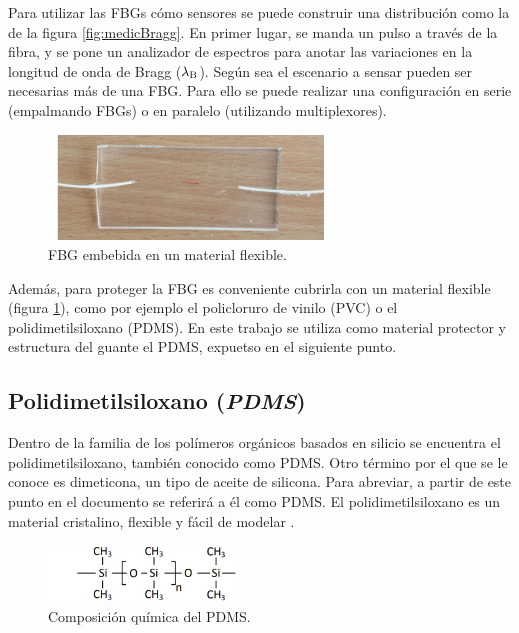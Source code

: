 \begin{itemize}
		Para utilizar las FBGs cómo sensores se puede construir una distribución como la de la figura \ref{fig:medicBragg}. En primer lugar, se manda un pulso a través de la fibra, y se pone un analizador de espectros para anotar las variaciones en la longitud de onda de Bragg ($\lambda\textsubscript{B}$). Según sea el escenario a sensar pueden ser necesarias más de una FBG. Para ello se puede realizar una configuración en serie (empalmando FBGs) o en paralelo (utilizando multiplexores). 
		
		\begin{figure}[H]
			\centering
			\includegraphics[width=0.65\textwidth]{./img/flexibleFBG}
			\caption{FBG embebida en un material flexible. \cite{nedomaPDMS}} 
			\label{fig:flexibleFBG}
		\end{figure}
	
		Además, para proteger la FBG es conveniente cubrirla con un material flexible (figura \ref{fig:flexibleFBG}), como por ejemplo el policloruro de vinilo (PVC) o el polidimetilsiloxano (PDMS). En este trabajo se utiliza como material protector y estructura del guante el PDMS, expuetso en el siguiente punto.
	
\end{itemize}


\subsection{Polidimetilsiloxano (\textit{PDMS})}
\label{sec:pdms3}
	
	Dentro de la familia de los polímeros orgánicos basados en silicio se encuentra el polidimetilsiloxano, también conocido como PDMS. Otro término por el que se le conoce es dimeticona, un tipo de aceite de silicona. Para abreviar, a partir de este punto en el documento se referirá a él como PDMS. El polidimetilsiloxano es un material cristalino, flexible y fácil de modelar \cite{propPDMS}.
	
	\begin{figure}[H]
		\centering
		\includegraphics[width=0.45\textwidth]{./img/compPDMS}
		\caption{Composición química del PDMS. \cite{nedomaPDMS}} 
		\label{fig:compFBG}
	\end{figure}
	
